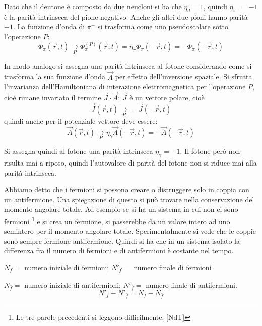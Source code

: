 Dato che il deutone è composto da due neucloni si ha che $\eta_d = 1$, quindi $\eta_{\pi^-} = -1$ è la parità intrinseca del pione
negativo. Anche gli altri due pioni hanno parità $-1$. La funzione d'onda di $\pi^-$ si trasforma come uno pseudoscalare sotto
l'operazione $P$:
\begin{equation*}
\Phi_{\pi}(\vec{r},t) \xrightarrow[P] \quad \Phi_{\pi}^{(P)}(\vec{r},t) = \eta_{\pi} \Phi_{\pi}(-\vec{r},t) =
-\Phi_{\pi}(-\vec{r},t)
\end{equation*}


In modo analogo si assegna una parità intrinseca al fotone considerando come si trasforma la sua funzione d'onda $\vec{A}$ per
effetto dell'inversione spaziale. Si sfrutta l'invarianza dell'Hamiltoniana di interazione elettromagnetica per l'operazione $P$,
cioè rimane invariato il termine $\vec{J}\cdot\vec{A}$; $\vec{J}$ è un vettore polare, cioè
\begin{equation*}
 \vec{J}(\vec{r},t) \xrightarrow[P]{} -\vec{J}(-\vec{r},t)
\end{equation*}
quindi anche per il potenziale vettore deve essere:
\begin{equation*}
 \vec{A}(\vec{r},t) \xrightarrow[P]{} \eta_{\gamma}\vec{A}(-\vec{r},t) = -\vec{A}(-\vec{r},t)
\end{equation*}

Si assegna quindi al fotone una parità intrinseca $\eta_{\gamma} = -1$. Il fotone però non risulta mai a riposo, quindi
l'autovalore di parità del fotone non si riduce mai alla parità intrinseca.

Abbiamo detto che i fermioni si possono creare o distruggere solo in coppia con un antifermione. Una spiegazione di questo si può
trovare nella conservazione del momento angolare totale. Ad esempio se si ha un sistema in cui non ci sono fermioni \footnote{Le
tre parole precedenti si leggono difficilmente. [NdT]} e si crea un fermione, si passerebbe da un valore intero ad uno semintero per il
momento angolare totale.
Sperimentalmente si vede che le coppie sono sempre fermione antifermione. Quindi si ha che in un sistema isolato la differenza
fra il numero di fermioni e di antifermioni è costante nel tempo.

$N_f =$ numero iniziale di fermioni; $N'_f =$ numero finale di fermioni

$N_{\bar{f}} =$ numero iniziale di antifermioni; $N'_{\bar{f}} =$ numero finale di antifermioni.
\begin{equation*}
 N'_f - N'_{\bar{f}} = N_f - N_{\bar{f}}
\end{equation*}

